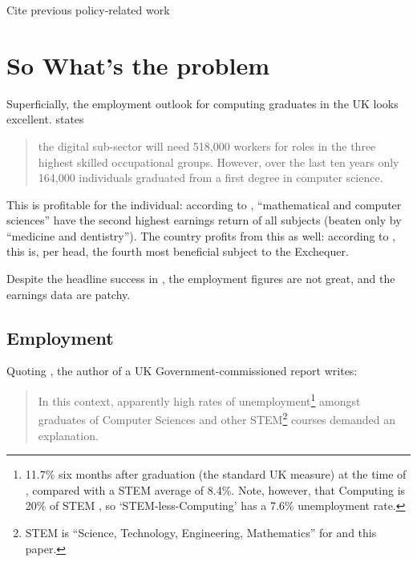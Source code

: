 \documentclass[sigconf]{acmart}
\begin{document}
Cite previous policy-related
work~\cite{crick+sentance:2011,brown-et-al:sigcse2013,brown-et-al:toce2014,crick+moller:wipsce2015,moller+crick:jce2018}

\section{So What's the problem}

Superficially, the employment outlook for computing graduates in the
UK looks excellent. \cite[p.~74]{UKCES2015b} states
\begin{quote} the digital sub-sector will need 518,000 workers for
roles in the three highest skilled occupational groups. However, over
the last ten years only 164,000 individuals graduated from a first
degree in computer science.
\end{quote} This is profitable for the individual: according to
\cite[Figure 4]{BIS2011a}, ``mathematical and computer sciences'' have
the second highest earnings return of all subjects (beaten only by
``medicine and dentistry'').  The country profits from this as well:
according to \cite[p.~16]{BIS2011a}, this is, per head, the fourth
most beneficial subject to the Exchequer.


Despite the headline success in \cite{BIS2011a}, the employment
figures are not great, and the earnings data are patchy.

\subsection{Employment}

Quoting \cite{UKCES2015b}, the author of a UK Government-commissioned
report \cite{Shadbolt2016a} writes:

\begin{quote} In this context, apparently high rates of
unemployment\footnote{11.7\% six months after graduation (the standard
UK measure) at the time of \cite{Shadbolt2016a}, compared with a STEM
average of 8.4\%. Note, however, that Computing is 20\% of STEM
\cite[Table 1]{Wakeham2016a}, so `STEM-less-Computing' has a 7.6\%
unemployment rate.} amongst graduates of Computer Sciences and other
STEM\footnote{STEM is ``Science, Technology, Engineering,
Mathematics'' for \cite{Shadbolt2016a} and this paper.} courses
demanded an explanation.
\end{quote}
\end{document}
